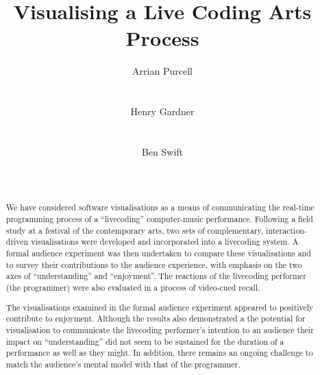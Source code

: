 \documentclass{sig-alternate}
\begin{document}

\title{Visualising a Live Coding Arts Process}

\author{
\alignauthor Arrian Purcell\\
       \\
       \\
\alignauthor Henry Gardner\\
       \\
       \\
\alignauthor Ben Swift\\
       \\
       \\
}

\maketitle
\begin{abstract}

We have considered software visualisations as a means of communicating the real-time programming process of a ``livecoding'' computer-music performance. Following a field study at a festival of the contemporary arts, two sets of complementary, interaction-driven visualisations were developed and incorporated into a livecoding system. A formal audience experiment was then undertaken to compare these visualisations and to survey their contributions to the audience experience, with emphasis on the two axes of ``understanding'' and ``enjoyment''. The reactions of the livecoding performer (the programmer) were also evaluated in a process of video-cued recall.

The visualisations examined in the formal audience experiment appeared to positively contribute to enjoyment. Although the results also demonstrated a the potential for visualisation to communicate the livecoding performer's intention to an audience their impact on ``understanding'' did not seem to be sustained for the duration of a performance as well as they might. In addition, there remains an ongoing challenge to match the audience's mental model with that of the programmer.

\end{abstract}
\end{document}
